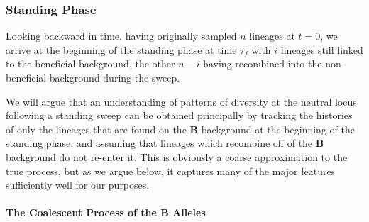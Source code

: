 \documentclass[a4paper,10pt]{article}
\newcommand{\fancyN}{$\mathcal N$ }
\newcommand{\fancyB}{$\mathcal B$ }
\begin{document}



\subsubsection{Standing Phase}
Looking backward in time, having originally sampled $n$ lineages at $t=0$, we arrive at the beginning of the standing phase at time $\tau_{f}$ with $i$ lineages still linked to the beneficial background, the other $n-i$ having recombined into the non-beneficial background during the sweep.

We will argue that an understanding of patterns of diversity at the neutral locus following a standing sweep can be obtained principally by tracking the histories of only the lineages that are found on the \textbf{B} background at the beginning of the standing phase, and assuming that lineages which recombine off of the \textbf{B} background do not re-enter it. This is obviously a coarse approximation to the true process, but as we argue below, it captures many of the major features sufficiently well for our purposes.


\paragraph{The Coalescent Process of the B Alleles}

\end{document}
